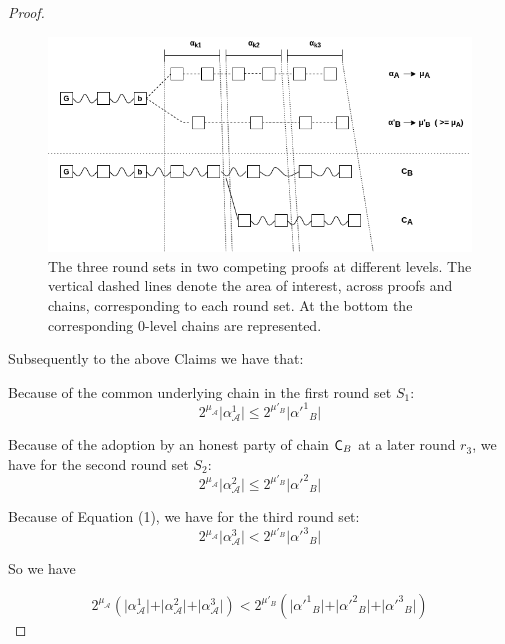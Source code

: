 \begin{proof}
	\begin{figure}[h]
		\begin{center}
			\includegraphics[width=0.9\columnwidth]{figures/claim3.png}
		\end{center}
		\caption{The three round sets in two competing proofs at different levels.
		The vertical dashed lines denote the area of interest, across proofs and chains,
		corresponding to each round set. At the bottom the corresponding 0-level chains
		are represented.}
		\label{fig:claim3}
	\end{figure}

	Subsequently to the above Claims we have that:

	Because of the common underlying chain in the first round set $S_1$:
	\begin{equation} \label{eq_round_set_1}
	2^{\mu_\mathcal{A}} \vert \alpha^1_\mathcal{A} \vert \leq 2^{\mu'_B} \vert \alpha'^1{_B} \vert
	\end{equation}

	Because of the adoption by an honest party of chain $\mathsf{C}_B$ at a later round $r_3$, 
	we have for the second round set $S_2$:
	\begin{equation} \label{eq_round_set_2}
	2^{\mu_\mathcal{A}} \vert \alpha^2_\mathcal{A} \vert \leq 2^{\mu'_B} \vert \alpha'^2{_B} \vert
	\end{equation}

	Because of Equation (1), we have for the third round set:
	\begin{equation} \label{eq_round_set_3}
	2^{\mu_\mathcal{A}} \vert \alpha^3_\mathcal{A} \vert < 2^{\mu'_B} \vert \alpha'^3{_B} \vert
	\end{equation}

	So we have

	\begin{equation*}
	2^{\mu_\mathcal{A}} ( \vert \alpha^1_\mathcal{A} \vert + \vert \alpha^2_\mathcal{A} \vert + \vert
	\alpha^3_\mathcal{A} \vert ) < 2^{\mu'_B} ( \vert \alpha'^1{_B} \vert + \vert
	\alpha'^2{_B} \vert + \vert \alpha'^3{_B} \vert)
	\end{equation*}


\end{proof}
